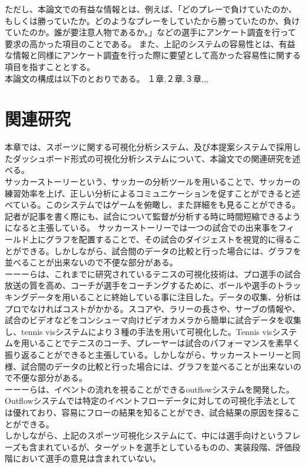 \documentclass[sotsuron]{kuee}
\begin{document}
ただし、本論文での有益な情報とは、例えば、「どのプレーで負けていたのか、もしくは勝っていたか。どのようなプレーをしていたから勝っていたのか、負けていたのか。誰が要注意人物であるか。」などの選手にアンケート調査を行って要求の高かった項目のことである。
また、上記のシステムの容易性とは、有益な情報と同様にアンケート調査を行った際に要望として高かった容易性に関する項目を指すこととする。
\\本論文の構成は以下のとおりである。
１章,２章,３章,,,


\chapter{関連研究}
本章では、スポーツに関する可視化分析システム、及び本提案システムで採用したダッシュボード形式の可視化分析システムについて、本論文での関連研究を述べる。
\\サッカーストーリーという、サッカーの分析ツールを用いることで、サッカーの練習効率を上げ、正しい分析によるコミュニケーションを促すことができると述べている。このシステムではゲームを俯瞰し、また詳細をも見ることができる。記者が記事を書く際にも、試合について監督が分析する時に時間短縮できるようになると主張している。
サッカーストーリーでは一つの試合での出来事をフィールド上にグラフを配置することで、その試合のダイジェストを視覚的に得ることができる。しかしながら、試合間のデータの比較と行った場合には、グラフを並べることが出来ないので不便な部分がある。
\\ーーーらは、これまでに研究されているテニスの可視化技術は、プロ選手の試合放送の質を高め、コーチが選手をコーチングするために、ボールや選手のトラッキングデータを用いることに終始している事に注目した。データの収集、分析はプロでなければコストがかかる。スコアや、ラリーの長さや、サーブの情報や、試合のビデオなどをコンシューマ向けビデオカメラから簡単に試合データを収集し、tennis visシステムにより３種の手法を用いて可視化した。Tennis visシステムを用いることでテニスのコーチ、プレーヤーは試合のパフォーマンスを素早く振り返ることができると主張している。しかしながら、サッカーストーリーと同様、試合間のデータの比較と行った場合には、グラフを並べることが出来ないので不便な部分がある。
\\ーーーらは、イベントの流れを視ることができるoutflowシステムを開発した。Outflowシステムでは特定のイベントフローデータに対しての可視化手法としては優れており、容易にフローの結果を知ることができ、試合結果の原因を探ることができる。
\\しかしながら、上記のスポーツ可視化システムにて、中には選手向けというフレーズも含まれているが、ターゲットを選手としているものの、実装段階、評価段階において選手の意見は含まれていない。
\end{document}
